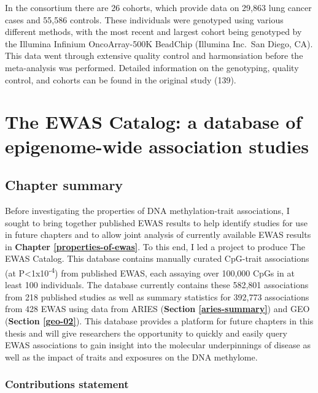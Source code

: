 \documentclass[11pt,oneside]{bristolthesis}
\begin{document}
In the consortium there are 26 cohorts, which provide data on 29,863 lung cancer cases and 55,586 controls. These individuals were genotyped using various different methods, with the most recent and largest cohort being genotyped by the Illumina Infinium OncoArray-500K BeadChip (Illumina Inc.~San Diego, CA). This data went through extensive quality control and harmonsiation before the meta-analysis was performed. Detailed information on the genotyping, quality control, and cohorts can be found in the original study (139).

\hypertarget{ewas-catalog}{%
\chapter{The EWAS Catalog: a database of epigenome-wide association studies}\label{ewas-catalog}}

\hypertarget{chapter-summary-03}{%
\section{Chapter summary}\label{chapter-summary-03}}

Before investigating the properties of DNA methylation-trait associations, I sought to bring together published EWAS results to help identify studies for use in future chapters and to allow joint analysis of currently available EWAS results in \textbf{Chapter \ref{properties-of-ewas}}. To this end, I led a project to produce The EWAS Catalog. This database contains manually curated CpG-trait associations (at P\textless1x10\textsuperscript{-4}) from published EWAS, each assaying over 100,000 CpGs in at least 100 individuals. The database currently contains these 582,801 associations from 218 published studies as well as summary statistics for 392,773 associations from 428 EWAS using data from ARIES (\textbf{Section \ref{aries-summary}}) and GEO (\textbf{Section \ref{geo-02}}). This database provides a platform for future chapters in this thesis and will give researchers the opportunity to quickly and easily query EWAS associations to gain insight into the molecular underpinnings of disease as well as the impact of traits and exposures on the DNA methylome.

\hypertarget{contributions-statement-03}{%
\subsection{Contributions statement}\label{contributions-statement-03}}
\end{document}
